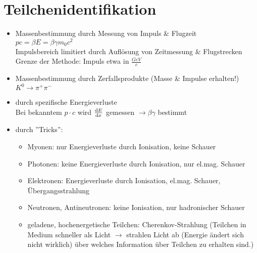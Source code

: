 \documentclass[Ex4_Zusammenfassung.tex]{subfiles}
\begin{document}
\section{Teilchenidentifikation}
\begin{itemize}
	\item Massenbestimmung durch Messung von Impuls \& Flugzeit\\
		$pc = \beta E = \beta \gamma m_0 c^2$\\
		Impulsbereich limitiert durch Auflösung von Zeitmessung \& Flugstrecken\\
		Grenze der Methode: Impuls etwa in $\frac{\si{GeV}}{c}$
	\item Massenbestimmung durch Zerfallsprodukte (Masse \& Impulse erhalten!)\\
		$K^0 \rightarrow \pi^+ \pi^-$
	\item durch spezifische Energieverluste\\
		Bei bekanntem $p\cdot c$ wird $\frac{\mathrm{d} E}{\mathrm{d} x}$ gemessen $\rightarrow \beta \gamma$ bestimmt
	\item durch ''Tricks'':
		\begin{itemize}
			\item Myonen: nur Energieverluste durch Ionisation, keine Schauer
			\item Photonen: keine Energieverluste durch Ionisation, nur el.mag. Schauer
			\item Elektronen: Energieverluste durch Ionisation, el.mag. Schauer, Übergangsstrahlung
			\item Neutronen, Antineutronen: keine Ionisation, nur hadronischer Schauer
			\item geladene, hochenergetische Teilchen: Cherenkov-Strahlung (Teilchen in Medium schneller als Licht $\rightarrow$ strahlen Licht ab (Energie ändert sich nicht wirklich) über welches Information über Teilchen zu erhalten sind.)
		\end{itemize} 
\end{itemize}
\end{document}
